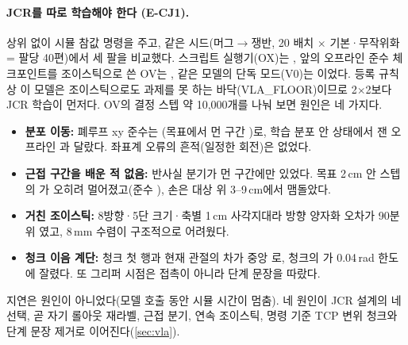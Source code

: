 \paragraph{JCR를 따로 학습해야 한다 (E-CJ1).} 상위 없이 시뮬 참값 명령을 주고, 같은 시드(머그$\rightarrow$쟁반, 20 배치 $\times$ 기본·무작위화 = 팔당 40편)에서 세 팔을 비교했다. 스크립트 실행기(OX)는 , 앞의 오프라인 준수  체크포인트를 조이스틱으로 쓴 OV는 , 같은 모델의 단독 모드(V0)는 이었다. 등록 규칙상 이 모델은 조이스틱으로도 과제를 못 하는 바닥(VLA\_FLOOR)이므로 2$\times$2보다 JCR 학습이 먼저다. OV의 결정 스텝 약 10,000개를 나눠 보면 원인은 네 가지다.
\begin{itemize}
  \item \textbf{분포 이동:} 폐루프 xy 준수는 (목표에서 먼 구간 )로, 학습 분포 안 상태에서 잰 오프라인 과 달랐다. 좌표계 오류의 흔적(일정한 회전)은 없었다.
  \item \textbf{근접 구간을 배운 적 없음:} 반사실 분기가 먼 구간에만 있었다. 목표 2\,cm 안 스텝의 가 오히려 멀어졌고(준수 ), 손은 대상 위 3--9\,cm에서 맴돌았다.
  \item \textbf{거친 조이스틱:} 8방향·5단 크기·축별 1\,cm 사각지대라 방향 양자화 오차가 90분위 였고, 8\,mm 수렴이 구조적으로 어려웠다.
  \item \textbf{청크 이음 계단:} 청크 첫 행과 현재 관절의 차가 중앙 로, 청크의 가 0.04\,rad 한도에 잘렸다. 또 그리퍼 시점은 접촉이 아니라 단계 문장을 따랐다.
\end{itemize}
지연은 원인이 아니었다(모델 호출 동안 시뮬 시간이 멈춤). 네 원인이 JCR 설계의 네 선택, 곧 자기 롤아웃 재라벨, 근접 분기, 연속 조이스틱, 명령 기준 TCP 변위 청크와 단계 문장 제거로 이어진다(\cref{sec:vla}).
